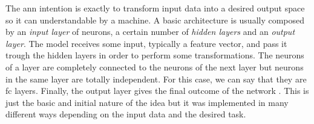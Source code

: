 	The \acrshort{ann} intention is exactly to transform input data into a desired output space so it can understandable by a machine. A basic architecture is usually composed by an \textit{input layer} of neurons, a certain number of \textit{hidden layers} and an \textit{output layer}. The model receives some input, typically a feature vector, and pass it trough the hidden layers in order to perform some transformations. The neurons of a layer are completely connected to the neurons of the next layer but neurons in the same layer are totally independent. For this case, we can say that they are \acrfull{fc} layers. Finally, the output layer gives the final outcome of the network \cite{Kwon2011}. This is just the basic and initial nature of the idea but it was implemented in many different ways depending on the input data and the desired task.
	
	
	
	
	
	
	

	
	
	
	

	
	
	
	
	
	
	
	